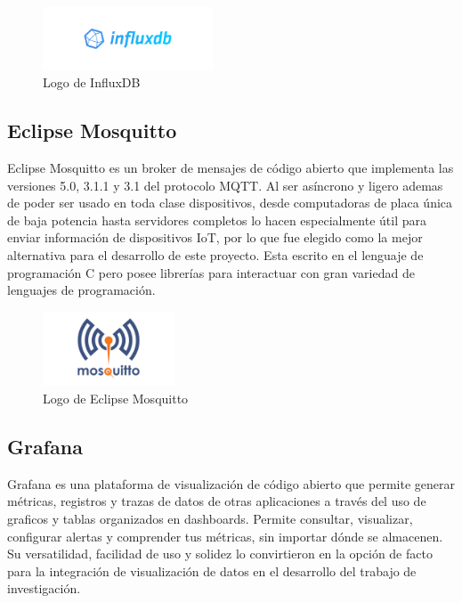 \begin{figure}[ht]
\vspace*{-15pt}
\centering
\includegraphics[width=0.45\textwidth]{Figuras/Influxdb_logo.png}
\caption{\label{fig:influxdb-logo}Logo de InfluxDB}
\vspace*{-15pt}
\end{figure}

\subsection{Eclipse Mosquitto}
Eclipse Mosquitto es un broker de mensajes de código abierto que implementa las versiones 5.0, 3.1.1 y 3.1 del protocolo MQTT. Al ser asíncrono y ligero ademas de poder ser usado en toda clase dispositivos, desde computadoras de placa única de baja potencia hasta servidores completos lo hacen especialmente útil para enviar información de dispositivos IoT, por lo que fue elegido como la mejor alternativa para el desarrollo de este proyecto. Esta escrito en el lenguaje de programación C pero posee librerías para interactuar con gran variedad de lenguajes de programación. 

\begin{figure}[ht]
\centering
\includegraphics[width=0.35\textwidth]{Figuras/mosquitto_logo.png}
\caption{\label{fig:mosquitto-logo}Logo de Eclipse Mosquitto}
\vspace*{-10pt}
\end{figure}

\subsection{Grafana}
Grafana es una plataforma de visualización de código abierto que permite generar métricas, registros y trazas de datos de otras aplicaciones a través del uso de graficos y tablas organizados en dashboards. Permite consultar, visualizar, configurar alertas y comprender tus métricas, sin importar dónde se almacenen. Su versatilidad, facilidad de uso y solidez lo convirtieron en la opción de facto para la integración de visualización de datos en el desarrollo del trabajo de investigación.

